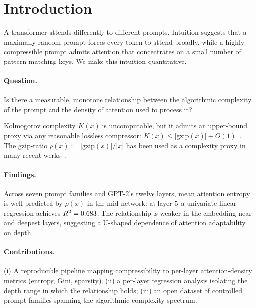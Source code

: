 \section{Introduction}
A transformer attends differently to different prompts. Intuition
suggests that a maximally random prompt forces every token to attend
broadly, while a highly compressible prompt admits attention that
concentrates on a small number of pattern-matching keys. We make this
intuition quantitative.

\paragraph{Question.} Is there a measurable, monotone relationship
between the algorithmic complexity of the prompt and the density of
attention used to process it?

Kolmogorov complexity $K(x)$ is uncomputable, but it admits an
upper-bound proxy via any reasonable lossless compressor:
$K(x) \le |\text{gzip}(x)| + O(1)$~\cite{li2008introduction}. The
gzip-ratio
$\rho(x) := |\text{gzip}(x)|/|x|$ has been used as a complexity proxy
in many recent works~\cite{jiang2023low,delete2024gzip}.

\paragraph{Findings.} Across seven prompt families and GPT-2's twelve
layers, mean attention entropy is well-predicted by $\rho(x)$ in the
mid-network: at layer $5$ a univariate linear
regression achieves $R^2=0.683$. The relationship is weaker
in the embedding-near and deepest layers, suggesting a U-shaped
dependence of attention adaptability on depth.

\paragraph{Contributions.} (i) A reproducible pipeline mapping
compressibility to per-layer attention-density metrics (entropy, Gini,
sparsity); (ii) a per-layer regression analysis isolating the depth
range in which the relationship holds; (iii) an open dataset of
controlled prompt families spanning the algorithmic-complexity spectrum.
